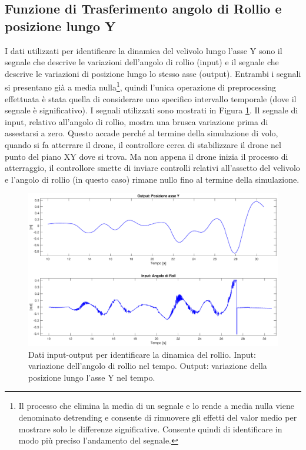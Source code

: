 \pagebreak

\subsection{Funzione di Trasferimento angolo di Rollio e posizione lungo Y}
I dati utilizzati per identificare la dinamica del velivolo lungo l'asse Y sono il segnale che descrive le variazioni dell'angolo di rollio (input) e il segnale che descrive le variazioni di posizione lungo lo stesso asse (output). Entrambi i segnali si presentano già a media nulla\footnote{Il processo che elimina la media di un segnale e lo rende a media nulla viene denominato detrending e consente di rimuovere gli effetti del valor medio per mostrare solo le differenze significative. Consente quindi di identificare in modo più preciso l'andamento del segnale.}, quindi l'unica operazione di preprocessing effettuata è stata quella di considerare uno specifico intervallo temporale (dove il segnale è significativo). I segnali utilizzati sono mostrati in Figura \ref{fig:ry_input}. Il segnale di input, relativo all'angolo di rollio, mostra una brusca variazione prima di assestarsi a zero. Questo accade perché al termine della simulazione di volo, quando si fa atterrare il drone, il controllore cerca di stabilizzare il drone nel punto del piano XY dove si trova. Ma non appena il drone inizia il processo di atterraggio, il controllore smette di inviare controlli relativi all'assetto del velivolo e l'angolo di rollio (in questo caso) rimane nullo fino al termine della simulazione.

\begin{figure}[H]
	\centering
	\includegraphics[width=1\textwidth]{gfx/SysId/ryinput}
	\caption[Dati input-output per identificare la dinamica del rollio.]{Dati input-output per identificare la dinamica del rollio. Input: variazione dell'angolo di rollio nel tempo. Output: variazione della posizione lungo l'asse Y nel tempo.}
	\label{fig:ry_input}
\end{figure}

